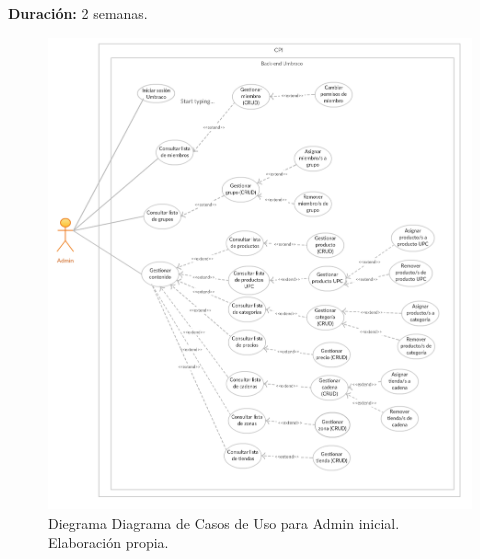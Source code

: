         
\textbf{Duración:} 2 semanas.

       \begin{figure}[H]
       \begin{center}
       \includegraphics[width=\textwidth]{cu_admin_inicial.png}
       \caption{Diegrama Diagrama de Casos de Uso para Admin inicial. Elaboración propia.}
       \label{fig:cu_admin_inicial}
       \end{center}
       \end{figure}

